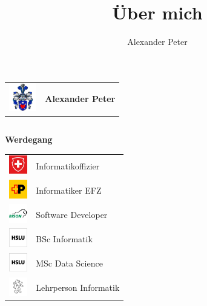 \documentclass[aspectratio=169]{beamer}
\title{Über mich}
\author{Alexander Peter}
\date{}
\begin{document}
\begin{frame}[t]
    \begin{center}
        \begin{tabular}{@{}m{1.6cm} l@{}}
            \includegraphics[width=1.2cm]{images/profile-picture.png} & {\LARGE\bfseries Alexander Peter} \\
        \end{tabular}
    \end{center}

    \vspace{0.3cm}

    \begin{columns}[T,onlytextwidth]
        \begin{column}{0.5\textwidth}
            \textbf{Werdegang}\\[0.3cm]
            \begin{tabular}{@{}m{0.9cm} m{5cm}@{}}
                \includegraphics[width=0.8cm]{images/logo_swiss_armed_forces.jpg} & Informatikoffizier \\
                \includegraphics[width=0.8cm]{images/logo_swiss_post.jpg} & Informatiker EFZ \\
                \includegraphics[width=0.8cm]{images/logo_bison.jpg} & Software Developer \\
                \includegraphics[width=0.8cm]{images/logo_hslu_hochschule_luzern.jpg} & BSc Informatik \\
                \includegraphics[width=0.8cm]{images/logo_hslu_hochschule_luzern.jpg} & MSc Data Science \\
                \includegraphics[width=0.8cm]{images/logo_bzz_bildung.jpg} & Lehrperson Informatik \\
            \end{tabular}
        \end{column}


\end{columns}
\end{frame}
\end{document}
